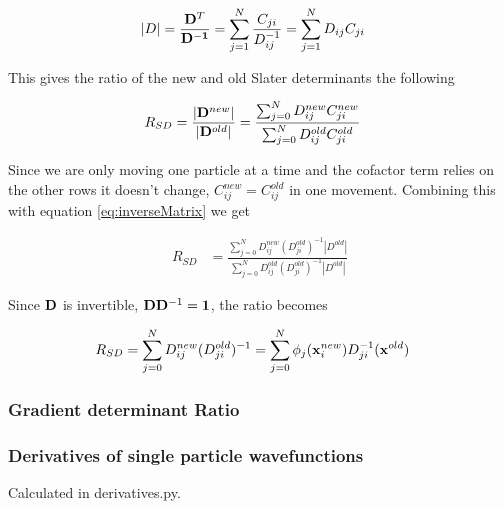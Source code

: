 \documentclass[11pt]{article}
\begin{document}
			\begin{align}
				|D| &= \frac{\vb{D}^T}{\vb{D^{-1}}} = \sum_{j=1}^{N}{\frac{C_{ji}  }{ D^{-1}_{ij} } } = \sum_{j=1}^{N}{ D_{ij}C_{ji} }
				\label{eq:inverseMatrix}
			\end{align}

			This gives the ratio of the new and old Slater determinants the following

			\begin{align}
				R_{SD} &= \frac{|\vb{D}^{new}|}{|\vb{D}^{old}|} = \frac{\sum_{j=0}^N D_{ij}^{new} C_{ji}^{new} }{\sum_{j=0}^N D_{ij}^{old} C_{ji}^{old} }
			\end{align}

			Since we are only moving one particle at a time and the cofactor term relies on the other rows it doesn't change, \(C^{new}_{ij} = C^{old}_{ij}\) in one movement. Combining this with equation \eqref{eq:inverseMatrix} we get

			\begin{align}
				R_{SD} &=  \frac{\sum_{j=0}^N D_{ij}^{new} (D_{ji}^{old})^{-1} |D^{old}| }{\sum_{j=0}^N D_{ij}^{old} (D_{ji}^{old})^{-1} |D^{old}| }
			\end{align}

			Since \(\vb{D}\) is invertible, \(\vb{D}\vb{D}^{-1} = \vb{1}\), the ratio becomes

			\begin{align}
				R_{SD} &= \sum_{j = 0}^{N}D_{ij}^{new}(D_{ji}^{old})^{-1} = \sum_{j = 0}^{N} \phi_j(\vb{x}^{new}_i) D_{ji}^{-1}(\vb{x}^{old})
			\end{align}

		\subsubsection{Gradient determinant Ratio}

		\subsubsection{Derivatives of single particle wavefunctions}
			Calculated in  derivatives.py.
\end{document}
